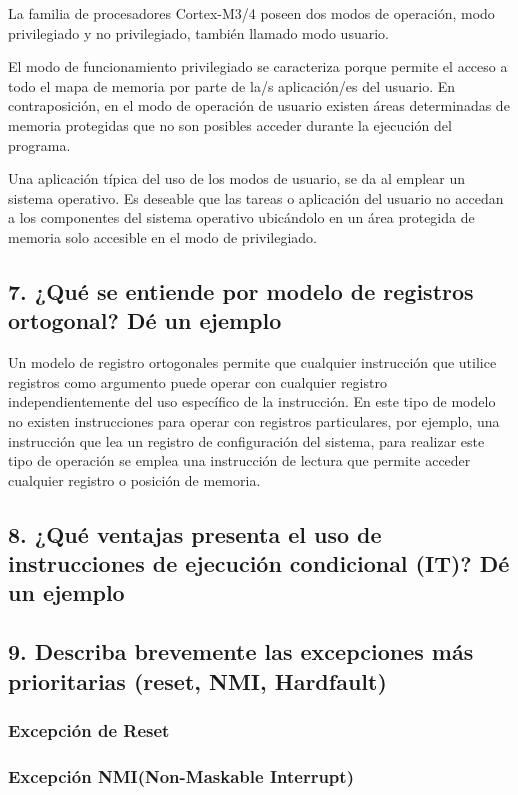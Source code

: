 \documentclass[10pt,a4paper,twoside,spanish]{article}	%
\begin{document}
La familia de procesadores Cortex-M3/4 poseen dos modos de operación, modo privilegiado y no privilegiado, también llamado modo usuario.

El modo de funcionamiento privilegiado se caracteriza porque permite el acceso a todo el mapa de memoria por parte de la/s aplicación/es del usuario. En contraposición, en el modo de operación de usuario existen áreas determinadas de memoria protegidas que no son posibles acceder durante la ejecución del programa.

Una aplicación típica del uso de los modos de usuario, se da al emplear un sistema operativo. Es deseable que las tareas o aplicación del usuario no accedan a los componentes del sistema operativo ubicándolo en un área protegida de memoria solo accesible en el modo de privilegiado.     

\subsection*{7. ¿Qué se entiende por modelo de registros ortogonal? Dé un ejemplo}

Un modelo de registro ortogonales permite que cualquier instrucción que utilice registros como argumento puede operar con cualquier registro independientemente del uso específico de la instrucción. En este tipo de modelo no existen instrucciones para operar con registros particulares, por ejemplo, una instrucción que lea un registro de configuración del sistema, para realizar este tipo de operación se emplea una instrucción de lectura que permite acceder cualquier registro o posición de memoria.


\subsection*{8. ¿Qué ventajas presenta el uso de instrucciones de ejecución condicional (IT)? Dé un ejemplo}

\subsection*{9. Describa brevemente las excepciones más prioritarias (reset, NMI, Hardfault)}

\subsubsection*{Excepción de Reset}

\subsubsection*{Excepción NMI(Non-Maskable Interrupt)} 
\end{document}
